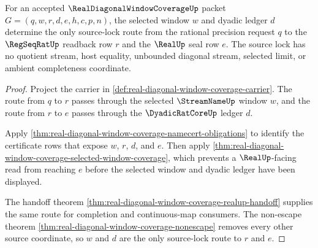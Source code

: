 \begin{theorem}
\label{thm:real-diagonal-window-coverage-selected-window-source-lock}
For an accepted $\RealDiagonalWindowCoverageUp$ packet $G=(q,w,r,d,e,h,c,p,n)$, the selected window $w$ and dyadic ledger $d$ determine the only source-lock route from the rational precision request $q$ to the $\RegSeqRatUp$ readback row $r$ and the $\RealUp$ seal row $e$. The source lock has no quotient stream, host equality, unbounded diagonal stream, selected limit, or ambient completeness coordinate.
\end{theorem}
\begin{proof}
Project the carrier in \autoref{def:real-diagonal-window-coverage-carrier}. The route from $q$ to $r$ passes through the selected $\StreamNameUp$ window $w$, and the route from $r$ to $e$ passes through the $\DyadicRatCoreUp$ ledger $d$.

Apply \autoref{thm:real-diagonal-window-coverage-namecert-obligations} to identify the certificate rows that expose $w$, $r$, $d$, and $e$. Then apply \autoref{thm:real-diagonal-window-coverage-selected-window-coverage}, which prevents a $\RealUp$-facing read from reaching $e$ before the selected window and dyadic ledger have been displayed.

The handoff theorem \autoref{thm:real-diagonal-window-coverage-realup-handoff} supplies the same route for completion and continuous-map consumers. The non-escape theorem \autoref{thm:real-diagonal-window-coverage-nonescape} removes every other source coordinate, so $w$ and $d$ are the only source-lock route to $r$ and $e$.
\end{proof}

